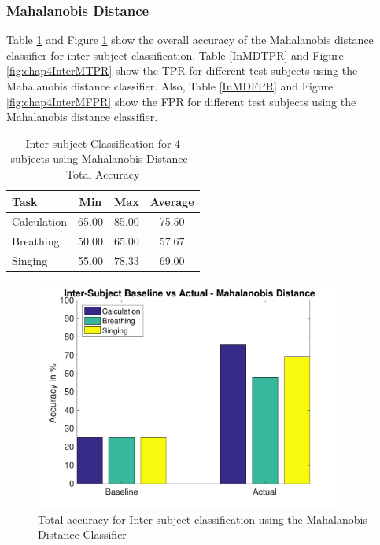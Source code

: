     \subsubsection{Mahalanobis Distance}
    Table \ref{InMD} and Figure \ref{fig:chap4InterMT} show the overall accuracy of the Mahalanobis distance classifier for inter-subject classification. Table \ref{InMDTPR} and Figure \ref{fig:chap4InterMTPR} show the TPR for different test subjects using the Mahalanobis distance classifier. Also, Table \ref{InMDFPR} and Figure \ref{fig:chap4InterMFPR} show the FPR for different test subjects using the Mahalanobis distance classifier.
		\begin{table}[h!]
			\centering
			\caption{Inter-subject Classification for 4 subjects using Mahalanobis Distance - Total Accuracy}
			\label{InMD}
			\begin{tabular}{l c c c}
				\hline
				Task &Min &Max &Average\\\hline
				Calculation &65.00 &85.00 &75.50\\
				Breathing &50.00 &65.00   &57.67\\
				Singing &55.00 &78.33     &69.00\\
			\end{tabular}
		\end{table}

		\begin{figure}[hbtp]
	    	\centering
	    	\includegraphics[width=0.90\textwidth]{Chapter-4/base_tim}
	    	\caption{Total accuracy for Inter-subject classification using the Mahalanobis Distance Classifier}
	    	\label{fig:chap4InterMT}
    	\end{figure}

